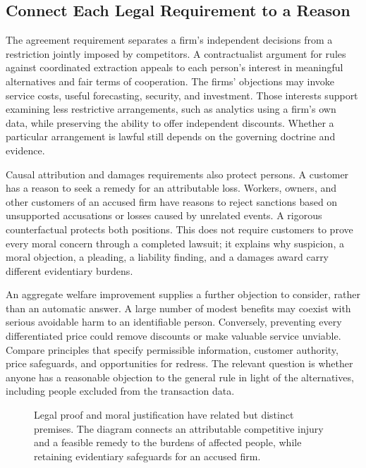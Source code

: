 \hypertarget{M09-connect-each-legal-requirement-to-a-reason}{%
\subsection{Connect Each Legal Requirement to a
Reason}\label{M09-connect-each-legal-requirement-to-a-reason}}

\noindent \noindent The agreement requirement separates a firm's independent
decisions from a restriction jointly imposed by competitors. A
contractualist argument for rules against coordinated extraction appeals
to each person's interest in meaningful alternatives and fair terms of
cooperation. The firms' objections may invoke service costs, useful
forecasting, security, and investment. Those interests support examining
less restrictive arrangements, such as analytics using a firm's own
data, while preserving the ability to offer independent discounts.
Whether a particular arrangement is lawful still depends on the
governing doctrine and evidence.

Causal attribution and damages requirements also protect persons. A
customer has a reason to seek a remedy for an attributable loss.
Workers, owners, and other customers of an accused firm have reasons to
reject sanctions based on unsupported accusations or losses caused by
unrelated events. A rigorous counterfactual protects both positions.
This does not require customers to prove every moral concern through a
completed lawsuit; it explains why suspicion, a moral objection, a
pleading, a liability finding, and a damages award carry different
evidentiary burdens.

An aggregate welfare improvement supplies a further objection to
consider, rather than an automatic answer. A large number of modest
benefits may coexist with serious avoidable harm to an identifiable
person. Conversely, preventing every differentiated price could remove
discounts or make valuable service unviable. Compare principles that
specify permissible information, customer authority, price safeguards,
and opportunities for redress. The relevant question is whether anyone
has a reasonable objection to the general rule in light of the
alternatives, including people excluded from the transaction data.

\begin{figure}[htbp]
\centering

\caption{Legal proof and moral justification have related but distinct premises. The diagram connects an attributable competitive injury and a feasible remedy to the burdens of affected people, while retaining evidentiary safeguards for an accused firm.}\label{fig:M09_antitrust_reasons}
\end{figure}

